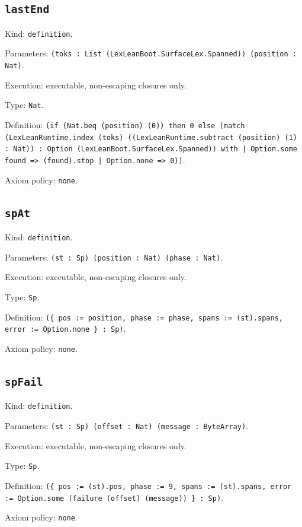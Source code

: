 \documentclass[11pt]{article}
\begin{document}
\subsection*{\texttt{lastEnd}}
\noindent Kind: \texttt{definition}.\par
\noindent Parameters: \texttt{(toks : List (LexLeanBoot.SurfaceLex.Spanned)) (position : Nat)}.\par
\noindent Execution: executable, non-escaping closures only.\par
\noindent Type: \texttt{Nat}.\par
\noindent Definition: \texttt{(if (Nat.beq (position) (0)) then 0 else (match (LexLeanRuntime.index (toks) ((LexLeanRuntime.subtract (position) (1) : Nat)) : Option (LexLeanBoot.SurfaceLex.Spanned)) with | Option.some found => (found).stop | Option.none => 0))}.\par
\noindent Axiom policy: \texttt{none}.\par
\subsection*{\texttt{spAt}}
\noindent Kind: \texttt{definition}.\par
\noindent Parameters: \texttt{(st : Sp) (position : Nat) (phase : Nat)}.\par
\noindent Execution: executable, non-escaping closures only.\par
\noindent Type: \texttt{Sp}.\par
\noindent Definition: \texttt{(\{ pos := position, phase := phase, spans := (st).spans, error := Option.none \} : Sp)}.\par
\noindent Axiom policy: \texttt{none}.\par
\subsection*{\texttt{spFail}}
\noindent Kind: \texttt{definition}.\par
\noindent Parameters: \texttt{(st : Sp) (offset : Nat) (message : ByteArray)}.\par
\noindent Execution: executable, non-escaping closures only.\par
\noindent Type: \texttt{Sp}.\par
\noindent Definition: \texttt{(\{ pos := (st).pos, phase := 9, spans := (st).spans, error := Option.some (failure (offset) (message)) \} : Sp)}.\par
\noindent Axiom policy: \texttt{none}.\par
\end{document}

